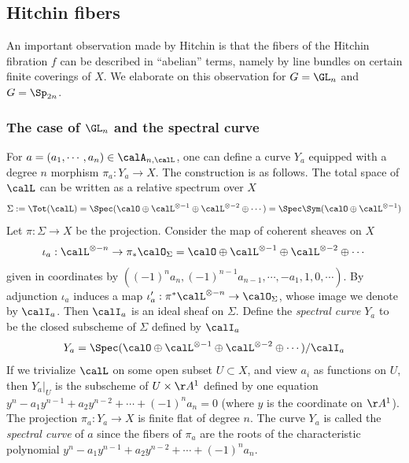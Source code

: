 \subsection{Hitchin fibers} An important observation made by Hitchin is that the fibers of the Hitchin fibration $f$ can be described in ``abelian'' terms, namely by line bundles on certain finite coverings of $X$. We elaborate on this observation for $G=\GL_{n}$ and $G=\Sp_{2n}$.

\subsubsection{The case of $\GL_{n}$ and the spectral curve}\label{sss:spectral curve} For $a=(a_{1},\cdots, a_{n})\in\calA_{n,\calL}$, one can define a curve $Y_{a}$ equipped with a degree $n$ morphism $\pi_{a}: Y_{a}\to X$. The construction is as follows. The total space of $\calL$ can be written as a relative spectrum over $X$
\begin{equation*}
\Sigma:=\Tot(\calL)=\Spec(\calO\oplus\calL^{\otimes -1}\oplus\calL^{\otimes -2}\oplus\cdots)=\Spec\Sym(\calO\oplus\calL^{\otimes -1})
\end{equation*}
Let $\pi: \Sigma\to X$ be the projection. Consider the map of coherent sheaves on $X$
\begin{equation*}
\iota_{a}: \calL^{\otimes -n}\to \pi_{*}\calO_{\Sigma}=\calO\oplus\calL^{\otimes -1}\oplus\calL^{\otimes -2}\oplus\cdots
\end{equation*}
given in coordinates by $((-1)^{n}a_{n}, (-1)^{n-1}a_{n-1},\cdots, -a_{1},1,0,\cdots)$. By adjunction $\iota_{a}$ induces a map $\iota'_{a}: \pi^{*}\calL^{\otimes -n}\to \calO_{\Sigma}$, whose image we denote by $\calI_{a}$.  Then $\calI_{a}$ is an ideal sheaf on $\Sigma$. Define the {\em spectral curve} $Y_{a}$ to be the closed subscheme of $\Sigma$ defined by $\calI_{a}$
\begin{equation*}
Y_{a}=\Spec(\calO\oplus\calL^{\otimes-1}\oplus\calL^{\otimes-2}\oplus\cdots)/\calI_{a}
\end{equation*}
If we trivialize $\calL$ on some open subset $U\subset X$, and view $a_{i}$ as functions on $U$, then $Y_{a}|_{U}$ is the subscheme of $U\times\AA^{1}$ defined by one equation $y^{n}-a_{1}y^{n-1}+a_{2}y^{n-2}+\cdots +(-1)^{n}a_{n}=0$ (where $y$ is the coordinate on $\AA^{1}$). The projection $\pi_{a}: Y_{a}\to X$ is finite flat of degree $n$. The curve $Y_{a}$ is called the {\em spectral curve} of $a$ since the fibers of $\pi_{a}$ are the roots of the characteristic polynomial $y^{n}-a_{1}y^{n-1}+a_{2}y^{n-2}+\cdots +(-1)^{n}a_{n}$.

